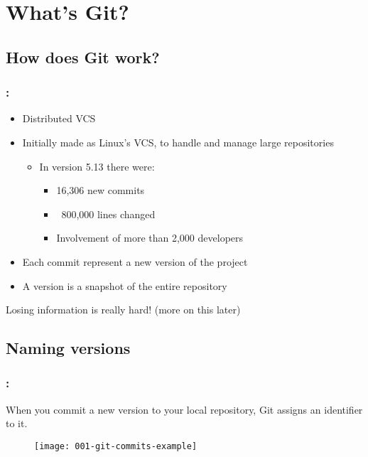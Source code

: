 \section{What's Git?}

\subsection{How does Git work?}

\begin{frame}
    \frametitle{\secname: \small\subsecname\normalsize}

    \begin{itemize}
        \item Distributed VCS
        \item Initially made as Linux's VCS, to handle and manage large repositories
        \begin{itemize}
            \item In version 5.13 there were:
            \begin{itemize}
                \item 16,306 new commits
                \item ~800,000 lines changed
                \item Involvement of more than 2,000 developers
            \end{itemize}
        \end{itemize}
        \item Each commit represent a new version of the project
        \item A version is a snapshot of the entire repository
    \end{itemize}

    Losing information is really hard! (more on this later)
\end{frame}

\subsection{Naming versions}

\begin{frame}
    \frametitle{\secname: \small\subsecname\normalsize}

    When you commit a new version to your local repository, Git assigns an identifier to it.

    \begin{figure}[h]
        \texttt{[image: 001-git-commits-example]}
        \centering
    \end{figure}
\end{frame}

